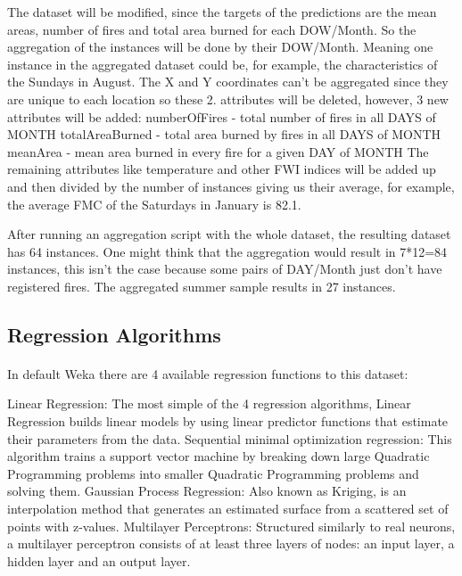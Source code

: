 \documentclass[runningheads]{llncs}
\begin{document}
The dataset will be modified, since the targets of the predictions are the mean areas, number of fires and total area burned for each DOW/Month. So the aggregation of the instances will be done by their DOW/Month. Meaning one instance in the aggregated dataset could be, for example, the characteristics of the Sundays in August.
The X and Y coordinates can't be aggregated since they are unique to each location so these 2.
attributes will be deleted, however, 3 new attributes will be added:
\hfill\break{}
numberOfFires - total number of fires in all DAYS of MONTH\hfill\break{}
totalAreaBurned - total area burned by fires in all DAYS of MONTH\hfill\break{}
meanArea - mean area burned in every fire for a given DAY of MONTH\hfill\break{}
The remaining attributes like temperature and other FWI indices will be added up and then divided by the number of instances giving us their average, for example, the average FMC of the Saturdays in January is 82.1.

After running an aggregation script with the whole dataset, the resulting dataset has 64 instances.
One might think that the aggregation would result in 7*12=84 instances, this isn't the case because some pairs of DAY/Month just don't have registered fires.
The aggregated summer sample results in 27 instances.

\subsection{Regression Algorithms}
\paragraph{}

In default Weka there are 4 available regression functions to this dataset:\break

Linear Regression\cite{lin}: The most simple of the 4 regression algorithms, Linear Regression builds linear models by using linear predictor functions that estimate their parameters from the data.\hfill\break{}
Sequential minimal optimization regression\cite{smo}: This algorithm trains a support vector machine by breaking down large Quadratic Programming problems into smaller Quadratic Programming problems and solving them.\hfill\break{}
Gaussian Process Regression\cite{gp}: Also known as Kriging, is an interpolation method that generates an estimated surface from a scattered set of points with z-values.\hfill\break{}
Multilayer Perceptrons\cite{mp}: Structured similarly to real neurons, a multilayer perceptron consists of at least three layers of nodes: an input layer, a hidden layer and an output layer.\hfill\break{}
\end{document}
